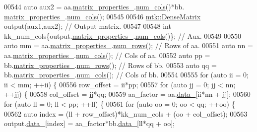 \begin{DoxyCode}
00544   \textcolor{keyword}{auto} aux2 = aa.\hyperlink{classmtk_1_1DenseMatrix_a481c8d09af685a5ba67acefdcaa810cc}{matrix\_properties\_}.\hyperlink{classmtk_1_1Matrix_a2160118d0edf51cf2aaa806ee1b915f8}{num\_cols}()*bb.
      \hyperlink{classmtk_1_1DenseMatrix_a481c8d09af685a5ba67acefdcaa810cc}{matrix\_properties\_}.\hyperlink{classmtk_1_1Matrix_a2160118d0edf51cf2aaa806ee1b915f8}{num\_cols}();
00545 
00546   \hyperlink{classmtk_1_1DenseMatrix}{mtk::DenseMatrix} output(aux1,aux2); \textcolor{comment}{// Output matrix.}
00547 
00548   \textcolor{keywordtype}{int} kk\_num\_cols\{output.\hyperlink{classmtk_1_1DenseMatrix_a481c8d09af685a5ba67acefdcaa810cc}{matrix\_properties\_}.\hyperlink{classmtk_1_1Matrix_a2160118d0edf51cf2aaa806ee1b915f8}{num\_cols}()\}; \textcolor{comment}{// Aux.}
00549 
00550   \textcolor{keyword}{auto} mm = aa.\hyperlink{classmtk_1_1DenseMatrix_a481c8d09af685a5ba67acefdcaa810cc}{matrix\_properties\_}.\hyperlink{classmtk_1_1Matrix_ab308b25b48e4fcd39fc60e0c3fc66dea}{num\_rows}(); \textcolor{comment}{// Rows of aa.}
00551   \textcolor{keyword}{auto} nn = aa.\hyperlink{classmtk_1_1DenseMatrix_a481c8d09af685a5ba67acefdcaa810cc}{matrix\_properties\_}.\hyperlink{classmtk_1_1Matrix_a2160118d0edf51cf2aaa806ee1b915f8}{num\_cols}(); \textcolor{comment}{// Cols of aa.}
00552   \textcolor{keyword}{auto} pp = bb.\hyperlink{classmtk_1_1DenseMatrix_a481c8d09af685a5ba67acefdcaa810cc}{matrix\_properties\_}.\hyperlink{classmtk_1_1Matrix_ab308b25b48e4fcd39fc60e0c3fc66dea}{num\_rows}(); \textcolor{comment}{// Rows of bb.}
00553   \textcolor{keyword}{auto} qq = bb.\hyperlink{classmtk_1_1DenseMatrix_a481c8d09af685a5ba67acefdcaa810cc}{matrix\_properties\_}.\hyperlink{classmtk_1_1Matrix_a2160118d0edf51cf2aaa806ee1b915f8}{num\_cols}(); \textcolor{comment}{// Cols of bb.}
00554 
00555   \textcolor{keywordflow}{for} (\textcolor{keyword}{auto} ii = 0; ii < mm; ++ii) \{
00556     row\_offset = ii*pp;
00557     \textcolor{keywordflow}{for} (\textcolor{keyword}{auto} jj = 0; jj < nn; ++jj) \{
00558       col\_offset = jj*qq;
00559       aa\_factor = aa.\hyperlink{classmtk_1_1DenseMatrix_a7893e4e5c8d2e2de32b156177e78cb6f}{data\_}[ii*nn + jj];
00560       \textcolor{keywordflow}{for} (\textcolor{keyword}{auto} ll = 0; ll < pp; ++ll) \{
00561         \textcolor{keywordflow}{for} (\textcolor{keyword}{auto} oo = 0; oo < qq; ++oo) \{
00562           \textcolor{keyword}{auto} index = (ll + row\_offset)*kk\_num\_cols + (oo + col\_offset);
00563           output.\hyperlink{classmtk_1_1DenseMatrix_a7893e4e5c8d2e2de32b156177e78cb6f}{data\_}[index] = aa\_factor*bb.\hyperlink{classmtk_1_1DenseMatrix_a7893e4e5c8d2e2de32b156177e78cb6f}{data\_}[ll*qq + oo];

\end{DoxyCode}
